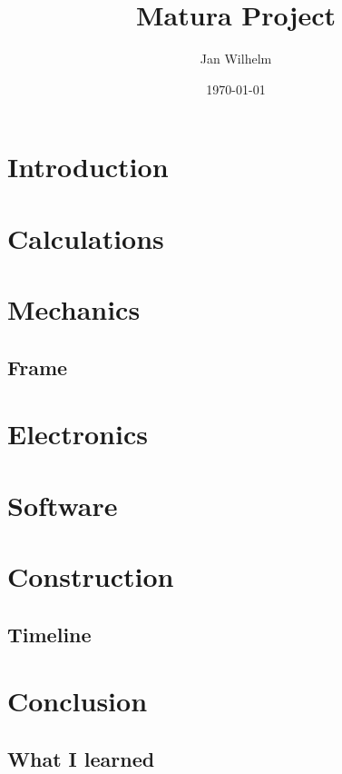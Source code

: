\documentclass[11pt]{report}
\title{Matura Project}
\author{Jan Wilhelm}
\date\today
\begin{document}
    \maketitle

    \tableofcontents
    \newpage


    \chapter{Introduction}\label{ch:introduction}
    

    \chapter{Calculations}\label{ch:calculations}
    

    \chapter{Mechanics}\label{ch:mechanics}


    \section{Frame}\label{sec:frame}


    \chapter{Electronics}\label{ch:electronics}


    \chapter{Software}\label{ch:software}


    \chapter{Construction}\label{ch:construction}

    \section{Timeline}\label{sec:timeline}

    \chapter{Conclusion}\label{ch:conclusion}

    \section{What I learned}\label{sec:learned}
\end{document}
